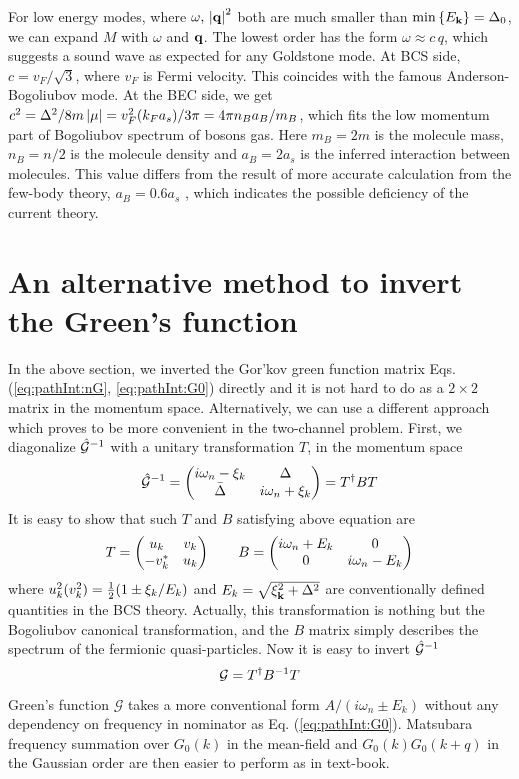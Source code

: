 For low energy modes, where $\omega,\,\left\lvert{\ensuremath{\mathbf{q}}}\right\rvert^{2}$ both are much smaller than $\min\left\{E_{\mathbf{k}}\right\}=\Delta_{0}$, we can expand $M$ with $\omega$ and $\mathbf{q}$.  The lowest order has the form $\omega\approx{}c\,q$, which suggests a sound wave as expected for any Goldstone mode.  At BCS side, $c=v_{F}/\sqrt{3}$, where $v_{F}$ is Fermi velocity.  This coincides with the famous Anderson-Bogoliubov mode.  At the BEC side, we get $c^{2}=\Delta^{2}/8m\left\lvert{\mu}\right\rvert=v_{F}^{2}(k_{F}a_{s})/3\pi=4\pi{}n_{B}a_{B}/m_{B}$, which fits the low momentum part of Bogoliubov spectrum of bosons gas.  Here $m_{B}=2m$ is the molecule mass, $n_{B}=n/2$ is the molecule density and $a_{B}=2a_{s}$ is the inferred  interaction between molecules.  This value differs from the result of more accurate calculation from the few-body theory, $a_{B}=0.6a_{s}$ \cite{Petrov}, which indicates the possible deficiency of the current theory. 


\section{An alternative method to invert the Green's function\label{sec:diagonalizeGreen1}}
In the above section, we inverted the  Gor'kov green function matrix Eqs. (\ref{eq:pathInt:nG}, \ref{eq:pathInt:G0}) directly and it is not hard to do as a $2\times2$ matrix in the  momentum space.   Alternatively, we can use a different approach which proves to be more convenient in the two-channel problem.  First, we diagonalize $\hat{\mathcal{G}}^{-1}$ with a unitary transformation $T$, in the momentum space
\begin{equation}
\hat{\mathcal{G}}^{-1}=\begin{pmatrix}i\omega_{n}-\xi_{k}&\Delta\\\bar\Delta&i\omega_{n}+\xi_{k}\end{pmatrix}=T^{\dagger}BT
\end{equation}
It is easy to show that such $T$ and $B$ satisfying above equation are
\begin{equation}
T=\begin{pmatrix}u_{k}&v_{k}\\-v_{k}^{*}&u_{k}\end{pmatrix}\qquad{}B=\begin{pmatrix}i\omega_{n}+E_{k}&0\\0&i\omega_{n}-E_{k}\end{pmatrix}
\end{equation}
where $u_{k}^{2}(v_{k}^{2})=\frac{1}{2}(1\pm\xi_{k}/E_{k})$ and $E_{k}=\sqrt{\xi^{2}_{\mathbf{k}}+\Delta^{2}}$ are conventionally defined quantities in the BCS theory.   Actually, this transformation is nothing but the Bogoliubov canonical transformation, and the $B$ matrix simply describes the spectrum of the fermionic quasi-particles.  Now it is easy to invert $\hat{\mathcal{G}}^{-1}$
\begin{equation}
\mathcal{G}=T^{\dagger}B^{-1}T
\end{equation}
Green's function $\mathcal{G}$ takes a more conventional form $A/(i\omega_{n}\pm{}E_{k})$ without any dependency on frequency in nominator as Eq. (\ref{eq:pathInt:G0}). Matsubara frequency summation over $G_{0}(k)$ in the mean-field and $G_{0}(k)G_{0}(k+q)$ in the Gaussian order are then easier to perform  as in text-book.  
